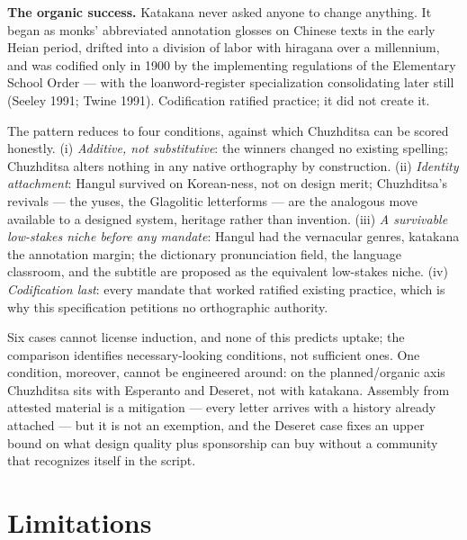 \documentclass[12pt]{article}
\begin{document}
\textbf{The organic success.} Katakana never asked anyone to change anything. It began as monks' abbreviated annotation glosses on Chinese texts in the early Heian period, drifted into a division of labor with hiragana over a millennium, and was codified only in 1900 by the implementing regulations of the Elementary School Order — with the loanword-register specialization consolidating later still (Seeley 1991; Twine 1991). Codification ratified practice; it did not create it.

The pattern reduces to four conditions, against which Chuzhditsa can be scored honestly. (i) \emph{Additive, not substitutive}: the winners changed no existing spelling; Chuzhditsa alters nothing in any native orthography by construction. (ii) \emph{Identity attachment}: Hangul survived on Korean-ness, not on design merit; Chuzhditsa's revivals — the yuses, the Glagolitic letterforms — are the analogous move available to a designed system, heritage rather than invention. (iii) \emph{A survivable low-stakes niche before any mandate}: Hangul had the vernacular genres, katakana the annotation margin; the dictionary pronunciation field, the language classroom, and the subtitle are proposed as the equivalent low-stakes niche. (iv) \emph{Codification last}: every mandate that worked ratified existing practice, which is why this specification petitions no orthographic authority.

Six cases cannot license induction, and none of this predicts uptake; the comparison identifies necessary-looking conditions, not sufficient ones. One condition, moreover, cannot be engineered around: on the planned/organic axis Chuzhditsa sits with Esperanto and Deseret, not with katakana. Assembly from attested material is a mitigation — every letter arrives with a history already attached — but it is not an exemption, and the Deseret case fixes an upper bound on what design quality plus sponsorship can buy without a community that recognizes itself in the script.

\section{Limitations}\label{sec:limits}
\end{document}
